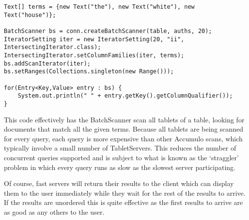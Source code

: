 \small
\begin{verbatim}
Text[] terms = {new Text("the"), new Text("white"), new Text("house")};

BatchScanner bs = conn.createBatchScanner(table, auths, 20);
IteratorSetting iter = new IteratorSetting(20, "ii", IntersectingIterator.class);
IntersectingIterator.setColumnFamilies(iter, terms);
bs.addScanIterator(iter);
bs.setRanges(Collections.singleton(new Range()));

for(Entry<Key,Value> entry : bs) {
    System.out.println(" " + entry.getKey().getColumnQualifier());
}
\end{verbatim}
\normalsize

This code effectively has the BatchScanner scan all tablets of a table, looking for
documents that match all the given terms. Because all tablets are being scanned for
every query, each query is more expensive than other Accumulo scans, which
typically involve a small number of TabletServers. This reduces the number of
concurrent queries supported and is subject to what is known as the `straggler'
problem in which every query runs as slow as the slowest server participating.

Of course, fast servers will return their results to the client which can display them
to the user immediately while they wait for the rest of the results to arrive. If the
results are unordered this is quite effective as the first results to arrive are as good
as any others to the user.

